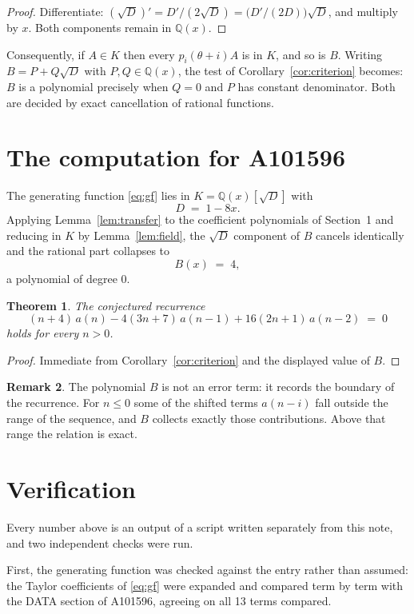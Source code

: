 \documentclass[11pt,a4paper]{article}
\theoremstyle{plain}
\newtheorem{theorem}{Theorem}
\theoremstyle{definition}
\newtheorem{remark}[theorem]{Remark}
\begin{document}
\begin{proof}
Differentiate: $(\sqrt{D})'=D'/(2\sqrt{D})=\bigl(D'/(2D)\bigr)\sqrt{D}$, and multiply by
$x$. Both components remain in $\mathbb{Q}(x)$.
\end{proof}

Consequently, if $A\in K$ then every $p_{i}(\theta+i)A$ is in $K$, and so is $B$. Writing
$B=P+Q\sqrt{D}$ with $P,Q\in\mathbb{Q}(x)$, the test of Corollary~\ref{cor:criterion}
becomes: $B$ is a polynomial precisely when $Q=0$ and $P$ has constant denominator. Both
are decided by exact cancellation of rational functions.

\section{The computation for A101596}

The generating function \eqref{eq:gf} lies in $K=\mathbb{Q}(x)[\sqrt{D}]$ with
\[
D \;=\; 1 - 8 x .
\]
Applying Lemma~\ref{lem:transfer} to the coefficient polynomials of Section~1 and reducing
in $K$ by Lemma~\ref{lem:field}, the $\sqrt{D}$ component of $B$ cancels identically and
the rational part collapses to
\[
B(x)\;=\;4 ,
\]
a polynomial of degree $0$.

\begin{theorem}
The conjectured recurrence
\[
(n + 4)\,a(n) -  4 \left(3 n + 7\right)\,a(n-1) + 16 \left(2 n + 1\right)\,a(n-2) \;=\;0
\]
holds for every $n>0$.
\end{theorem}

\begin{proof}
Immediate from Corollary~\ref{cor:criterion} and the displayed value of $B$.
\end{proof}

\begin{remark}
The polynomial $B$ is not an error term: it records the boundary of the recurrence. For
$n\le0$ some of the shifted terms $a(n-i)$ fall outside the range of the sequence,
and $B$ collects exactly those contributions. Above that range the relation is exact.
\end{remark}

\section{Verification}

Every number above is an output of a script written separately from this note, and two
independent checks were run.

First, the generating function was checked against the entry rather than assumed: the
Taylor coefficients of \eqref{eq:gf} were expanded and compared term by term with the DATA
section of A101596, agreeing on all 13 terms compared.
\end{document}
